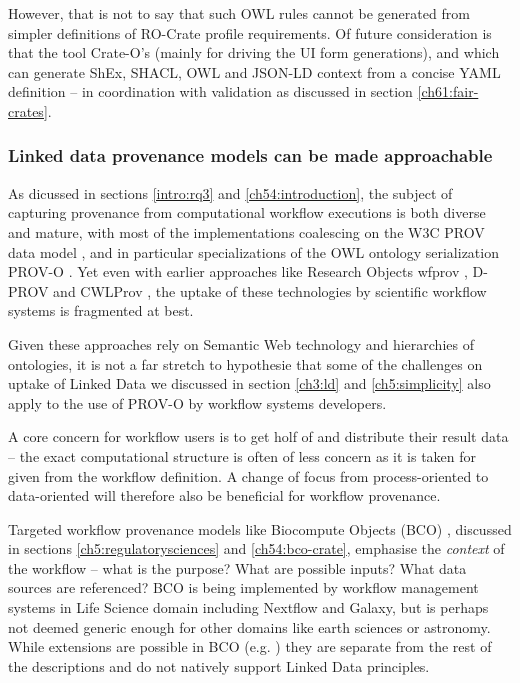 However, that is not to say that such OWL rules cannot be generated from simpler definitions of RO-Crate profile requirements. Of future consideration is that the tool Crate-O's   (mainly for driving the UI form generations), and  which can generate ShEx, SHACL, OWL and JSON-LD context from a concise YAML definition -- in coordination with validation as discussed in section \vref{ch61:fair-crates}.




\subsubsection{Linked data provenance models can be made approachable}

As dicussed in sections \vref{intro:rq3} and \vref{ch54:introduction}, the subject of capturing provenance from computational workflow executions is both diverse and mature, with most of the implementations coalescing on the W3C PROV data model \cite{Moreau 2013}, and in particular specializations of the OWL ontology serialization PROV-O \cite{w3-prov-o}. Yet even with earlier approaches like Research Objects wfprov \cite{Belhajjame 2015}, D-PROV \cite{Missier 2013} and CWLProv \cite{Khan 2019}, the uptake of these technologies by scientific workflow systems is fragmented at best.

Given these approaches rely on Semantic Web technology and hierarchies of ontologies, it is not a far stretch to hypothesie that some of the challenges on uptake of Linked Data we discussed in section \vref{ch3:ld} and \vref{ch5:simplicity} also apply to the use of PROV-O by workflow systems developers. 

A core concern for workflow users is to get holf of and distribute their result data -- the exact computational structure is often of less concern as it is taken for given from the workflow definition. A change of focus from process-oriented to data-oriented will therefore also be beneficial for workflow provenance. 

Targeted workflow provenance models like Biocompute Objects (BCO) \cite{ieee2791,Alterovitz 2018}, discussed in sections \vref{ch5:regulatorysciences} and \vref{ch54:bco-crate}, emphasise the \emph{context} of the workflow -- what is the purpose? What are possible inputs? What data sources are referenced?  BCO is being implemented by workflow management systems in Life Science domain including Nextflow and Galaxy, but is perhaps not deemed generic enough for other domains like earth sciences or astronomy.  While extensions are possible in BCO (e.g. ) they are separate from the rest of the descriptions and do not natively support Linked Data principles.

